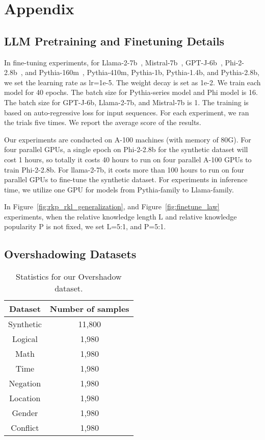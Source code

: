 \newpage
\section{Appendix}

\subsection{LLM Pretraining and Finetuning Details}
\label{ssec:implementation}



In fine-tuning experiments, for Llama-2-7b~\cite{touvron2023llama}, Mistral-7b~\cite{jiang2023mistral}, GPT-J-6b~\cite{gpt-j}, Phi-2-2.8b~\cite{gunasekar2023textbooks}, and Pythia-160m~\cite{mallen2023eliciting}, Pythia-410m, Pythia-1b, Pythia-1.4b, and Pythia-2.8b, we set the learning rate as lr=1e-5. The weight decay is set as 1e-2. We train each model for 40 epochs. The batch size for Pythia-series model and Phi model is 16. The batch size for GPT-J-6b, Llama-2-7b, and Mistral-7b is 1. The training is based on auto-regressive loss for input sequences. For each experiment, we ran the trials five times. We report the average score of the results.

Our experiments are conducted on A-100 machines (with memory of 80G). For four parallel GPUs, a single epoch on Phi-2-2.8b for the synthetic dataset will cost 1 hours, so totally it costs 40 hours to run on four parallel A-100 GPUs to train Phi-2-2.8b. For llama-2-7b, it costs more than 100 hours to run on four parallel GPUs to fine-tune the synthetic dataset.
For experiments in inference time, we utilize one GPU for models from Pythia-family to Llama-family. 

In Figure~\ref{fig:rkp_rkl_generalization}, and Figure~\ref{fig:finetune_law} experiments, when the relative knowledge length $\text{L}$ and relative knowledge popularity $\text{P}$ is not fixed, we set $\text{L}$=5:1, and $\text{P}$=5:1.


\subsection{Overshadowing Datasets}
\label{ssec: overshadowing_dataset}

\begin{table}[htb]
\centering
\begin{tabular}{|c|c|}
\hline
Dataset   & Number of samples \\ \hline
Synthetic & 11,800  \\ \hline
Logical   & 1,980   \\ \hline
Math      & 1,980   \\ \hline
Time      & 1,980   \\ \hline
Negation  & 1,980   \\ \hline
Location  & 1,980   \\ \hline
Gender    & 1,980   \\ \hline
Conflict  & 1,980   \\ \hline
\end{tabular}
\caption{Statistics for our Overshadow dataset.}
\end{table}

